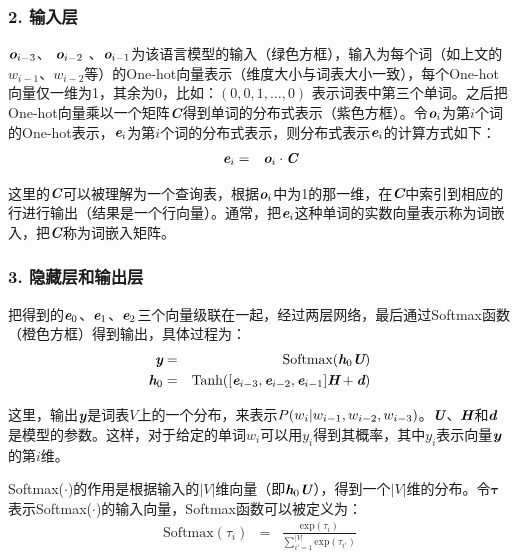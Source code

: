 \subsubsection{2. 输入层}

\parinterval  $ {\textbf{\em o}}_{i-3} $、 $ {\textbf{\em o}}_{i-2} $ 、$ {\textbf{\em o}}_{i-1} $为该语言模型的输入（绿色方框），输入为每个词（如上文的$ w_{i-1}$、$ w_{i-2}$等）的One-hot向量表示（维度大小与词表大小一致），每个One-hot向量仅一维为1，其余为0，比如：$ (0,0,1,\dots,0) $ 表示词表中第三个单词。之后把One-hot向量乘以一个矩阵$ \textbf{\em C} $得到单词的分布式表示（紫色方框）。令$ {\textbf{\em o}}_i $为第$ i $个词的One-hot表示，$ {\textbf{\em e}}_i $为第$ i $个词的分布式表示，则分布式表示$ {\textbf{\em e}}_i $的计算方式如下：
\begin{eqnarray}
{\textbf{\em e}}_i&=&{\textbf{\em o}}_i\cdot{\textbf{\em C}}
\label{eq:9-60}
\end{eqnarray}

\noindent  这里的$ \textbf{\em C} $可以被理解为一个查询表，根据$ {\textbf{\em o}}_i $中为1的那一维，在$ \textbf{\em C}$中索引到相应的行进行输出（结果是一个行向量）。通常，把${\textbf{\em e}}_i$这种单词的实数向量表示称为词嵌入，把$ \textbf{\em C} $称为词嵌入矩阵。


\subsubsection{3. 隐藏层和输出层}

\parinterval  把得到的$ {\textbf{\em e}}_0 $、$ {\textbf{\em e}}_1 $、$ {\textbf{\em e}}_2 $三个向量级联在一起，经过两层网络，最后通过Softmax函数（橙色方框）得到输出，具体过程为：
\begin{eqnarray}
{\textbf{\em y}}&=&{\textrm{Softmax}}({\textbf{\em h}}_0{\textbf{\em U}})\label{eq:9-61}\\
{\textbf{\em h}}_0&=&{\textrm{Tanh}}([{\textbf{\em e}}_{i-3},{\textbf{\em e}}_{i-2},{\textbf{\em e}}_{i-1}]{\textbf{\em H}}+{\textbf{\em d}})
\label{eq:9-62}
\end{eqnarray}

\noindent  这里，输出$ {\textbf{\em y}}$是词表$V$上的一个分布，来表示${P}(w_i|w_{i-1},w_{i-2},w_{i-3}) $。$ {\textbf{\em U}}$、${\textbf{\em H}}$和${\textbf{\em d}}$是模型的参数。这样，对于给定的单词$w_i$可以用$y_i$得到其概率，其中$y_i$表示向量${\textbf{\em y}}$的第$i$维。

\parinterval Softmax($\cdot$)的作用是根据输入的$|V|$维向量（即${\textbf{\em h}}_0{\textbf{\em U}}$），得到一个$|V|$维的分布。令${\bm \tau}$表示Softmax($\cdot$)的输入向量，Softmax函数可以被定义为：
\begin{eqnarray}
\textrm{Softmax}(\tau_i)&=&\frac{\textrm{exp}(\tau_i)}  {\sum_{i'=1}^{|V|} \textrm{exp}(\tau_{i'})}
\label{eq:9-120}
\end{eqnarray}

